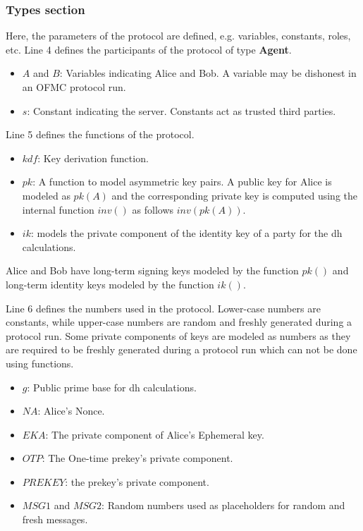\subsubsection{Types section} 
Here, the parameters of the protocol are defined, e.g. variables, constants, roles, etc. Line 4 defines the participants of the protocol of type \textbf{Agent}.
\begin{itemize}
	\item $A$ and $B$: Variables indicating Alice and Bob. A variable may be dishonest in an OFMC protocol run.
	\item $s$: Constant indicating the server. Constants act as trusted third parties.
\end{itemize}
\par
Line 5 defines the functions of the protocol.
\begin{itemize}
	\item $kdf$: Key derivation function.
	\item $pk$: A function to model asymmetric key pairs. A public key for Alice is modeled as $pk(A)$ and the corresponding private key is computed using the internal function $inv()$ as follows $inv(pk(A))$.
	\item $ik$: models the private component of the identity key of a party for the \gls{dh} calculations.
\end{itemize}
	Alice and Bob have long-term signing keys modeled by the function $pk()$ and long-term identity keys modeled by the function $ik()$.
	\par
Line 6 defines the numbers used in the protocol. Lower-case numbers are constants, while upper-case numbers are random and freshly generated during a protocol run. Some private components of keys are modeled as numbers as they are required to be freshly generated during a protocol run which can not be done using functions.
\begin{itemize}
	\item $g$: Public prime base for \gls{dh} calculations.
	\item $NA$: Alice's Nonce.
	\item $EKA$: The private component of Alice's Ephemeral key.
	\item $OTP$: The One-time prekey's private component.
	\item $PREKEY$: the prekey's private component.
	\item $MSG1$ and $MSG2$: Random numbers used as placeholders for random and fresh messages.
\end{itemize}

